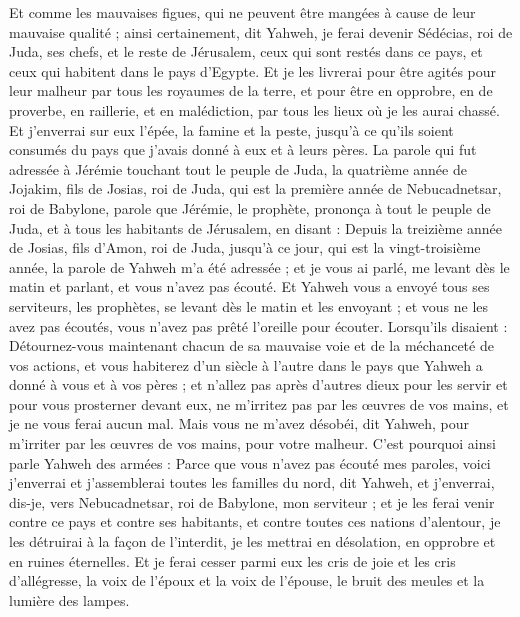 \begin{multicols}{2}
Et comme les mauvaises figues, qui ne peuvent être mangées à cause de leur mauvaise qualité ; ainsi certainement, dit Yahweh, je ferai devenir Sédécias, roi de Juda, ses chefs, et le reste de Jérusalem, ceux qui sont restés dans ce pays, et ceux qui habitent dans le pays d'Egypte.
Et je les livrerai pour être agités pour leur malheur par tous les royaumes de la terre, et pour être en opprobre, en de proverbe, en raillerie, et en malédiction, par tous les lieux où je les aurai chassé.
Et j'enverrai sur eux l'épée, la famine et la peste, jusqu'à ce qu'ils soient consumés du pays que j'avais donné à eux et à leurs pères.
\VerseOne{}La parole qui fut adressée à Jérémie touchant tout le peuple de Juda, la quatrième année de Jojakim, fils de Josias, roi de Juda, qui est la première année de Nebucadnetsar, roi de Babylone,
parole que Jérémie, le prophète, prononça à tout le peuple de Juda, et à tous les habitants de Jérusalem, en disant :
Depuis la treizième année de Josias, fils d'Amon, roi de Juda, jusqu'à ce jour, qui est la vingt-troisième année, la parole de Yahweh m'a été adressée ; et je vous ai parlé, me levant dès le matin et parlant, et vous n'avez pas écouté.
Et Yahweh vous a envoyé tous ses serviteurs, les prophètes, se levant dès le matin et les envoyant ; et vous ne les avez pas écoutés, vous n'avez pas prêté l'oreille pour écouter.
Lorsqu'ils disaient : Détournez-vous maintenant chacun de sa mauvaise voie et de la méchanceté de vos actions, et vous habiterez d'un siècle à l'autre dans le pays que Yahweh a donné à vous et à vos pères ;
et n'allez pas après d'autres dieux pour les servir et pour vous prosterner devant eux, ne m'irritez pas par les œuvres de vos mains, et je ne vous ferai aucun mal.
Mais vous ne m'avez désobéi, dit Yahweh, pour m'irriter par les œuvres de vos mains, pour votre malheur.
C'est pourquoi ainsi parle Yahweh des armées : Parce que vous n'avez pas écouté mes paroles,
voici j'enverrai et j'assemblerai toutes les familles du nord, dit Yahweh, et j'enverrai, dis-je, vers Nebucadnetsar, roi de Babylone, mon serviteur ; et je les ferai venir contre ce pays et contre ses habitants, et contre toutes ces nations d'alentour, je les détruirai à la façon de l'interdit, je les mettrai en désolation, en opprobre et en ruines éternelles.
Et je ferai cesser parmi eux les cris de joie et les cris d'allégresse, la voix de l'époux et la voix de l'épouse, le bruit des meules et la lumière des lampes.

\end{multicols}
